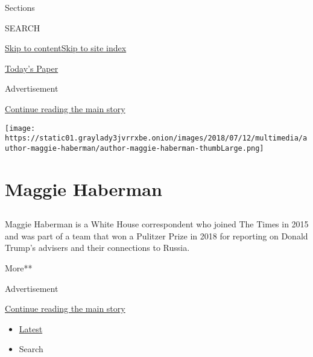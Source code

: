 Sections

SEARCH

\protect\hyperlink{site-content}{Skip to
content}\protect\hyperlink{site-index}{Skip to site index}

\href{https://myaccount.nytimes3xbfgragh.onion/auth/login?response_type=cookie\&client_id=vi}{}

\href{https://www.nytimes3xbfgragh.onion/section/todayspaper}{Today's
Paper}

Advertisement

\protect\hyperlink{after-top}{Continue reading the main story}

\texttt{[image: https://static01.graylady3jvrrxbe.onion/images/2018/07/12/multimedia/author-maggie-haberman/author-maggie-haberman-thumbLarge.png]}

\hypertarget{maggie-haberman}{%
\section{Maggie Haberman}\label{maggie-haberman}}

\subsection{}

Maggie Haberman is a White House correspondent who joined The Times in
2015 and was part of a team that won a Pulitzer Prize in 2018 for
reporting on Donald Trump's advisers and their connections to Russia.

More**

Advertisement

\protect\hyperlink{after-mid1}{Continue reading the main story}

\begin{itemize}
\tightlist
\item
  \protect\hyperlink{stream-panel}{Latest}
\item
  Search
\end{itemize}

